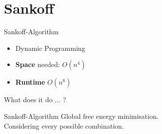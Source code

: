 \section{Sankoff}


\begin{frame}[c]{Sankoff-Algorithm}
    \Large
    \begin{itemize}[<+(1)->]
    \item Dynamic Programming
    \item {\bf Space} needed: $O(n^4)$
    \item {\bf Runtime} $O(n^6)$
    \end{itemize}
    \pause
    What does it do ... ?
\end{frame}


\begin{frame}[c]{Sankoff-Algorithm}
    \Large
    Global free energy minimisation. \\
    \pause
    Considering every possible combination.
\end{frame}


%






